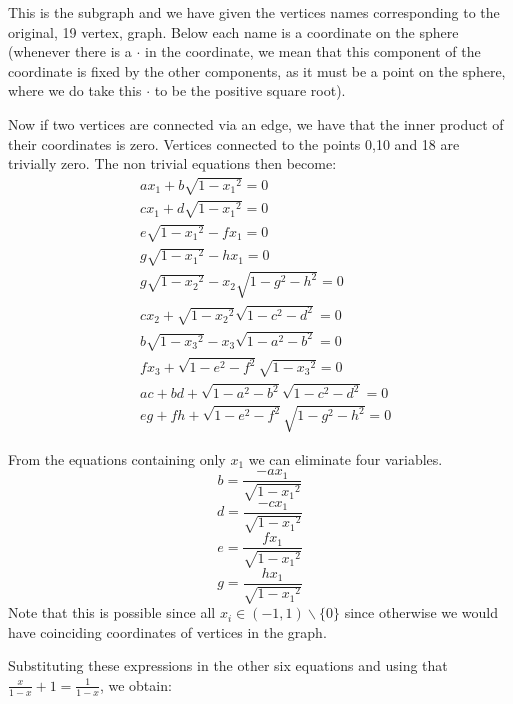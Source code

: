 \documentclass{report}
\begin{document}
This is the subgraph and we have given the vertices names corresponding
to the original, 19 vertex, graph. Below each name is a coordinate
on the sphere (whenever there is a $\cdot$ in the coordinate, we
mean that this component of the coordinate is fixed by the other
components, as it must be a point on the sphere, where we do take
this $\cdot$ to be the positive square root).

Now if two vertices are connected via an edge, we have that the
inner product of their coordinates is zero. Vertices connected to
the points 0,10 and 18 are trivially zero. The non trivial equations
then become:
\begin{align}
&ax_1 + b\sqrt{1-{x_1}^2}=0\\
&cx_1 + d\sqrt{1-{x_1}^2}=0\\
&e\sqrt{1-{x_1}^2} - fx_1=0\\
&g\sqrt{1-{x_1}^2} - hx_1=0\\
&g\sqrt{1-{x_2}^2} - x_2 \sqrt{1-g^2-h^2}=0\\
&cx_2 + \sqrt{1-{x_2}^2}\sqrt{1-c^2-d^2}=0\\
&b\sqrt{1-{x_3}^2} - x_3 \sqrt{1-a^2-b^2}=0\\
&fx_3 + \sqrt{1-e^2-f^2}\sqrt{1-{x_3}^2}=0\\
&ac + bd + \sqrt{1-a^2-b^2}\sqrt{1-c^2 - d^2} = 0\\
&eg + fh + \sqrt{1-e^2-f^2}\sqrt{1-g^2 - h^2} = 0
\end{align}

From the equations containing only $x_1$ we can eliminate four variables.
\begin{equation}
b = \frac{-a x_1}{\sqrt{1-{x_1}^2}} \tag{1'}
\end{equation}
\begin{equation}
d = \frac{-c x_1}{\sqrt{1-{x_1}^2}} \tag{2'}
\end{equation}
\begin{equation}
e = \frac{f x_1}{\sqrt{1-{x_1}^2}} \tag{3'}
\end{equation}
\begin{equation}
g = \frac{h x_1}{\sqrt{1-{x_1}^2}} \tag{4'}
\end{equation}
Note that this is possible since all $x_i \in (-1,1)\backslash
\{0\}$ since otherwise we would have coinciding coordinates of
vertices in the graph.

Substituting these expressions in the other six equations and using
that~$\tfrac{x}{1-x} +1 = \tfrac{1}{1-x}$, we obtain:
\end{document}
